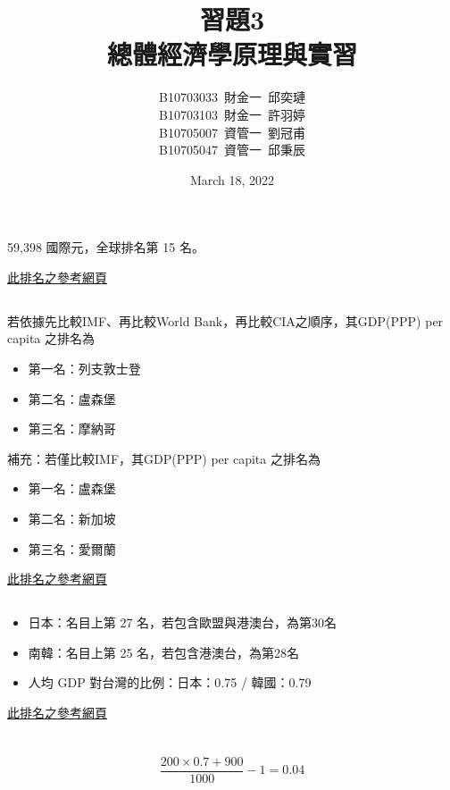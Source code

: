 \documentclass[11pt]{article}
\title{習題3 \\\Large 總體經濟學原理與實習}
\author{B10703033\ 財金一\ 邱奕璉
\\ B10703103\ 財金一\ 許羽婷
\\ B10705007\ 資管一\ 劉冠甫
\\ B10705047\ 資管一\ 邱秉辰}
\date{March 18, 2022}
\begin{document}
\maketitle

\section{} 
\subsection{}
59,398 國際元，全球排名第 15 名。

\href{https://bit.ly/36sWRVc}{此排名之參考網頁} 
\subsection{}
若依據先比較IMF、再比較World Bank，再比較CIA之順序，其GDP(PPP) per capita 之排名為
\begin{itemize}
    \item 第一名：列支敦士登
    \item 第二名：盧森堡
    \item 第三名：摩納哥
\end{itemize}
補充：若僅比較IMF，其GDP(PPP) per capita 之排名為
\begin{itemize}
    \item 第一名：盧森堡  
    \item 第二名：新加坡
    \item 第三名：愛爾蘭
\end{itemize}
\href{https://en.wikipedia.org/wiki/List_of_countries_by_GDP_(PPP)_per_capita}{此排名之參考網頁} 

\subsection{}
\begin{itemize}
    \item 日本：名目上第 27 名，若包含歐盟與港澳台，為第30名
    \item 南韓：名目上第 25 名，若包含港澳台，為第28名
    \item 人均 GDP 對台灣的比例：日本：0.75 / 韓國：0.79
\end{itemize}
\href{https://bit.ly/36sWRVc}{此排名之參考網頁} 

\section{}
\subsection{}
$$\frac{200\times 0.7 + 900}{1000} - 1 = 0.04$$
\end{document}
